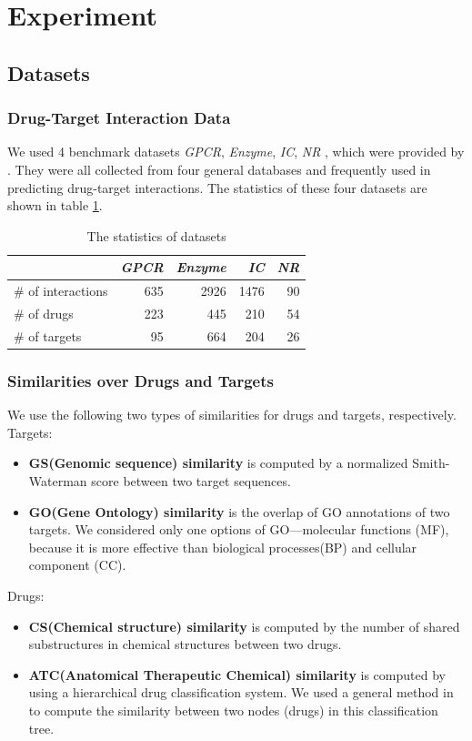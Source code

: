 \documentclass{article}
\begin{document}
\section{Experiment}

\subsection{Datasets}
\subsubsection{Drug-Target Interaction Data} 
We used 4 benchmark datasets \textit{GPCR}, \textit{Enzyme}, \textit{IC}, \textit{NR} , which were provided by \cite{ashburner2000gene}. They were all collected from four general databases and frequently used in predicting drug-target interactions.\cite{gonen2012predicting} The statistics of these four datasets are shown in table \ref{statistics-datasets}.
\begin{table}[h]
\centering
\begin{tabular}{lrrrr}
\toprule
 & \textit{GPCR} & \textit{Enzyme} & \textit{IC} & \textit{NR} \\
\midrule
\# of interactions &635 & 2926 & 1476 & 90 \\
\# of drugs &223 & 445 & 210 & 54\\
\# of targets &95 & 664 & 204 & 26\\
\bottomrule
\end{tabular}
\caption{The statistics of datasets}\label{statistics-datasets}
\end{table}

\subsubsection{Similarities over Drugs and Targets}
We use the following two types of similarities for drugs and targets, respectively.\\
Targets:
\begin{itemize}
\item \textbf{GS(Genomic sequence) similarity} is computed by a normalized Smith-Waterman score\cite{ashburner2000gene} between two target sequences.
\item \textbf{GO(Gene Ontology) similarity} is the overlap of GO annotations \cite{yamanishi2008prediction} of two targets. We considered only one options of GO---molecular functions (MF), because it is more effective than biological processes(BP) and cellular component (CC). 
\end{itemize}
Drugs:
\begin{itemize}
\item \textbf{CS(Chemical structure) similarity} is computed by the number of shared substructures in chemical structures between two drugs.
\item \textbf{ATC(Anatomical Therapeutic Chemical) similarity}\cite{PMID:15137231} is computed by using a hierarchical drug classification system. We used a general method in \cite{lin1998information} to compute the similarity between two nodes (drugs) in this classification tree. 
\end{itemize}
\end{document}
